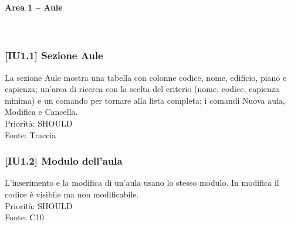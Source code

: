 \paragraph{Area 1 – Aule}~\\
\subsubsection{[IU1.1] Sezione Aule}
La sezione Aule mostra una tabella con colonne codice, nome, edificio, piano e capienza; un'area di ricerca con la scelta del criterio (nome, codice, capienza minima) e un comando per tornare alla lista completa; i comandi Nuova aula, Modifica e Cancella.\\
Priorità: SHOULD\\Fonte: Traccia

\subsubsection{[IU1.2] Modulo dell'aula}
L'inserimento e la modifica di un'aula usano lo stesso modulo. In modifica il codice è visibile ma non modificabile.\\
Priorità: SHOULD\\Fonte: C10
